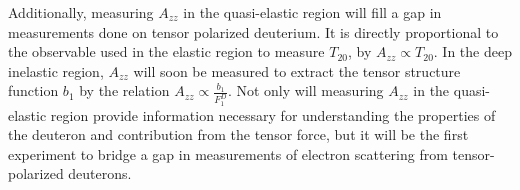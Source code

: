 Additionally, measuring $A_{zz}$ in the quasi-elastic region will fill a gap in measurements done on tensor polarized deuterium. It is directly proportional to the observable used in the elastic region to measure $T_{20}$, by $A_{zz} \propto T_{20}$. In the deep inelastic region, $A_{zz}$ will soon be measured to extract the tensor structure function $b_1$ by the relation $A_{zz} \propto \frac{b_1}{F_1^D}$. Not only will measuring $A_{zz}$ in the quasi-elastic region provide information necessary for understanding the properties of the deuteron and contribution from the tensor force, but it will be the first experiment to bridge a gap in measurements of electron scattering from tensor-polarized deuterons.






